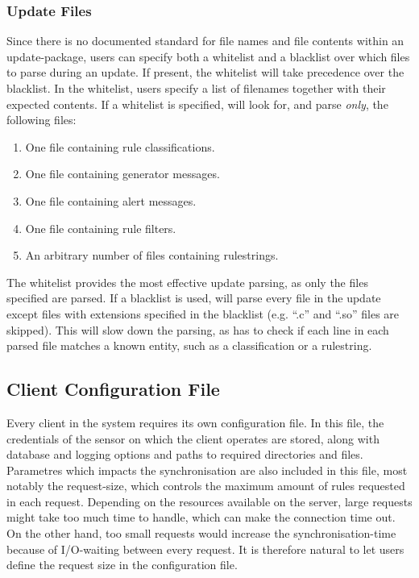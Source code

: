 \subsubsection{Update Files}
Since there is no documented standard for file names and file contents within an
update-package, users can specify both a whitelist and a blacklist over which
files to parse during an update. If present, the whitelist will take precedence
over the blacklist. In the whitelist, users specify a list of filenames together
with their expected contents. If a whitelist is specified, \snowman{} will look
for, and parse {\em only}, the following files:
\begin{enumerate}
  \item One file containing rule classifications.
  \item One file containing generator messages.
  \item One file containing alert messages.
  \item One file containing rule filters.
  \item An arbitrary number of files containing rulestrings.
\end{enumerate}
The whitelist provides the most effective update parsing, as only the files
specified are parsed. If a blacklist is used, \snowman{} will parse every file
in the update except files with extensions specified in the blacklist (e.g. ``.c'' and ``.so'' files
are skipped). This will slow down the parsing, as \snowman{} has to check if
each line in each parsed file matches a known entity, such as a classification
or a rulestring.

\subsection{Client Configuration File}
Every client in the system requires its own configuration file. In this file,
the credentials of the sensor on which the client operates are stored, along
with database and logging options and paths to required directories and files.
Parametres which impacts the synchronisation are also included in this file,
most notably the request-size, which controls the maximum amount of rules
requested in each request. Depending on the resources available on the server,
large requests might take too much time to handle, which can make the
connection time out. On the other hand, too small requests would increase the
synchronisation-time because of I/O-waiting between every request. It is
therefore natural to let users define the request size in the configuration
file.